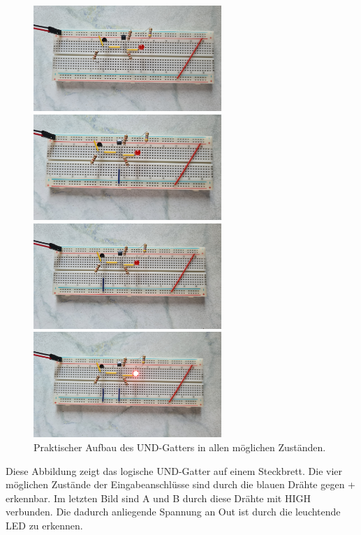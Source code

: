\begin{figure}[h!]
	\begin{minipage}{.5\textwidth}
		\centering
		\includegraphics[height=4cm, keepaspectratio]{./Fotos/UND-00.jpg}
		\vspace{1cm}
	\end{minipage}%
	\begin{minipage}{.5\textwidth}
		\centering
		\includegraphics[height=4cm, keepaspectratio]{./Fotos/UND-01.jpg}
		\vspace{1cm}
	\end{minipage}
	\begin{minipage}{.5\textwidth}
		\centering
		\includegraphics[height=4cm, keepaspectratio]{./Fotos/UND-10.jpg}
	\end{minipage}%
	\begin{minipage}{.5\textwidth}
		\centering
		\includegraphics[height=4cm, keepaspectratio]{./Fotos/UND-11.jpg}
	\end{minipage}
	\caption{Praktischer Aufbau des UND-Gatters in allen möglichen Zuständen.}
\end{figure}
\newpage
Diese Abbildung zeigt das logische UND-Gatter auf einem Steckbrett. Die vier möglichen Zustände der Eingabeanschlüsse sind durch die blauen Drähte gegen \glqq{}+\grqq{} erkennbar. Im letzten Bild sind A und B durch diese Drähte mit HIGH verbunden. Die dadurch anliegende Spannung an Out ist durch die leuchtende LED zu erkennen.

